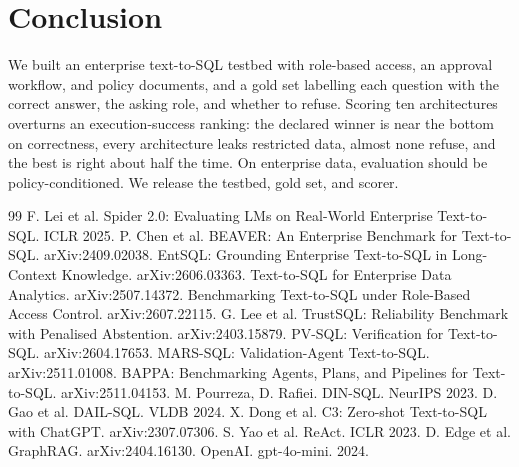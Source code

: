 \documentclass[10pt,twocolumn]{article}
\begin{document}
\section{Conclusion}
We built an enterprise text-to-SQL testbed with role-based access, an approval workflow, and policy
documents, and a gold set labelling each question with the correct answer, the asking role, and whether
to refuse. Scoring ten architectures overturns an execution-success ranking: the declared winner is
near the bottom on correctness, every architecture leaks restricted data, almost none refuse, and the
best is right about half the time. On enterprise data, evaluation should be policy-conditioned. We
release the testbed, gold set, and scorer.

\small
\begin{thebibliography}{99}
 F. Lei et al. Spider 2.0: Evaluating LMs on Real-World Enterprise Text-to-SQL. ICLR 2025.
 P. Chen et al. BEAVER: An Enterprise Benchmark for Text-to-SQL. arXiv:2409.02038.
 EntSQL: Grounding Enterprise Text-to-SQL in Long-Context Knowledge. arXiv:2606.03363.
 Text-to-SQL for Enterprise Data Analytics. arXiv:2507.14372.
 Benchmarking Text-to-SQL under Role-Based Access Control. arXiv:2607.22115.
 G. Lee et al. TrustSQL: Reliability Benchmark with Penalised Abstention. arXiv:2403.15879.
 PV-SQL: Verification for Text-to-SQL. arXiv:2604.17653.
 MARS-SQL: Validation-Agent Text-to-SQL. arXiv:2511.01008.
 BAPPA: Benchmarking Agents, Plans, and Pipelines for Text-to-SQL. arXiv:2511.04153.
 M. Pourreza, D. Rafiei. DIN-SQL. NeurIPS 2023.
 D. Gao et al. DAIL-SQL. VLDB 2024.
 X. Dong et al. C3: Zero-shot Text-to-SQL with ChatGPT. arXiv:2307.07306.
 S. Yao et al. ReAct. ICLR 2023.
 D. Edge et al. GraphRAG. arXiv:2404.16130.
 OpenAI. gpt-4o-mini. 2024.
\end{thebibliography}
\end{document}
